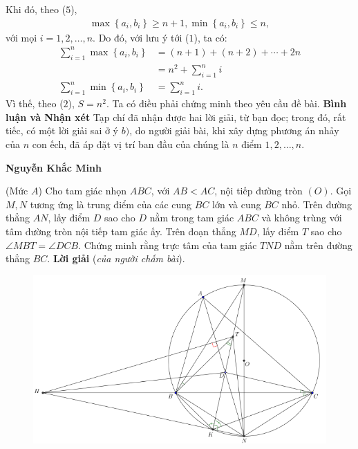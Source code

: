 \begin{multicols}{2}
	\vskip 0.05cm  
	Khi đó, theo ($5$),
	\begin{align*}
		\max \!\left\{\! {{a_i},{b_i}} \!\right\} \!\ge\! n \!+\! 1,\min\! \left\{\! {{a_i},{b_i}} \!\right\} \!\le\! n,
	\end{align*}
	với mọi $i = 1, 2, …, n$.
	\vskip 0.05cm
	Do đó, với lưu ý tới ($1$), ta có:
	\begin{align*}
		\sum\limits_{i = 1}^n {\max \left\{ {{a_i},{b_i}} \right\}}  &= \left( {n + 1} \right) + \left( {n + 2} \right) +  \cdots  + 2n \\
		&= {n^2} + \sum\limits_{i = 1}^n i\\
		\sum\limits_{i = 1}^n {\min \left\{ {{a_i},{b_i}} \right\}}  &= \sum\limits_{i = 1}^n i.
	\end{align*}
	Vì thế, theo ($2$), $S = n^2$.
	\vskip 0.05cm  
	Ta có điều phải chứng minh theo yêu cầu đề bài.
	\vskip 0.05cm
	\textbf{\color{thachthuctoanhoc}Bình luận và Nhận xét}
	\vskip 0.05cm
	Tạp chí đã nhận được hai lời giải, từ bạn đọc; trong đó, rất tiếc, có một lời giải sai ở ý $b)$, do người giải bài, khi xây dựng phương án nhảy của $n$ con ếch, đã áp đặt vị trí ban đầu của chúng là $n$ điểm $1, 2, \ldots, n$.
	\begin{flushright}
		\textbf{\color{thachthuctoanhoc}Nguyễn Khắc Minh}
	\end{flushright}
	{}
	(Mức $A$) Cho tam giác nhọn $ABC$, với $AB<AC$, nội tiếp đường tròn $(O)$. Gọi $M,N$ tương ứng là trung điểm của các cung $BC$ lớn và cung $BC$ nhỏ. Trên đường thẳng $AN$, lấy điểm $D$ sao cho $D$ nằm trong tam giác $ABC$ và không trùng với tâm đường tròn nội tiếp tam giác ấy. Trên đoạn thẳng $MD$, lấy điểm $T$ sao cho $\angle{MBT}=\angle{DCB}$. Chứng minh rằng trực tâm của tam giác $TND$ nằm trên đường thẳng $BC$.
	\vskip 0.05cm
	\textbf{\color{thachthuctoanhoc}Lời giải} (\textit{của người chấm bài}).
	\begin{figure}[H]
		\vspace*{-5pt}
		\centering
		\captionsetup{labelformat= empty, justification=centering}
		\includegraphics[width= 1\linewidth]{P669}

\end{figure}
\end{multicols}
